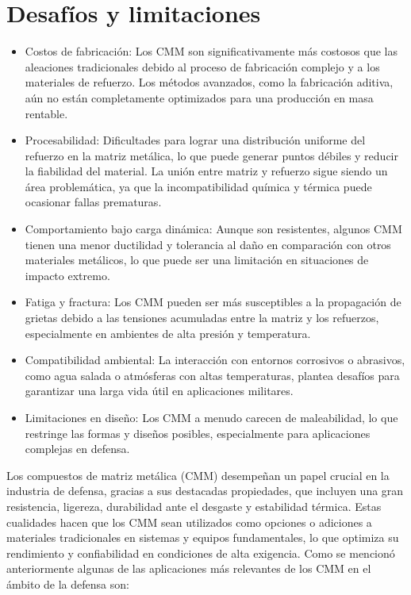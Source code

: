 \documentclass[letterpaper, 12pt]{article}
\begin{document}
\section{Desafíos y limitaciones}

\begin{itemize}
      \item Costos de fabricación: Los CMM son significativamente más costosos que las
            aleaciones tradicionales debido al proceso de fabricación complejo y a los
            materiales de refuerzo. Los métodos avanzados, como la fabricación aditiva, aún
            no están completamente optimizados para una producción en masa rentable.
      \item Procesabilidad: Dificultades para lograr una distribución uniforme del refuerzo
            en la matriz metálica, lo que puede generar puntos débiles y reducir la
            fiabilidad del material. La unión entre matriz y refuerzo sigue siendo un área
            problemática, ya que la incompatibilidad química y térmica puede ocasionar
            fallas prematuras.
      \item Comportamiento bajo carga dinámica: Aunque son resistentes, algunos CMM tienen
            una menor ductilidad y tolerancia al daño en comparación con otros materiales
            metálicos, lo que puede ser una limitación en situaciones de impacto extremo.
      \item Fatiga y fractura: Los CMM pueden ser más susceptibles a la propagación de
            grietas debido a las tensiones acumuladas entre la matriz y los refuerzos,
            especialmente en ambientes de alta presión y temperatura.
      \item Compatibilidad ambiental: La interacción con entornos corrosivos o abrasivos,
            como agua salada o atmósferas con altas temperaturas, plantea desafíos para
            garantizar una larga vida útil en aplicaciones militares.
      \item Limitaciones en diseño: Los CMM a menudo carecen de maleabilidad, lo que
            restringe las formas y diseños posibles, especialmente para aplicaciones
            complejas en defensa.

\end{itemize}

Los compuestos de matriz metálica (CMM) desempeñan un papel crucial en la
industria de defensa, gracias a sus destacadas propiedades, que incluyen una
gran resistencia, ligereza, durabilidad ante el desgaste y estabilidad térmica.
Estas cualidades hacen que los CMM sean utilizados como opciones o adiciones a
materiales tradicionales en sistemas y equipos fundamentales, lo que optimiza
su rendimiento y confiabilidad en condiciones de alta exigencia. Como se
mencionó anteriormente algunas de las aplicaciones más relevantes de los CMM en
el ámbito de la defensa son:
\end{document}
